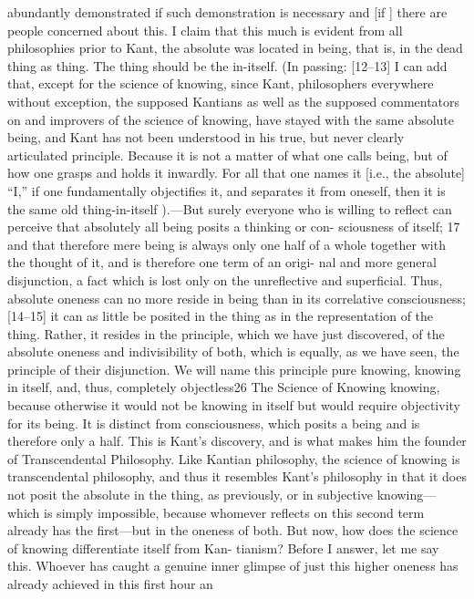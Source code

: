 abundantly demonstrated if such demonstration is necessary and [if ] there are
people concerned about this. I claim that this much is evident from all
philosophies prior to Kant, the absolute was located in being, that is, in the
dead thing as thing. The thing should be the in-itself. (In passing: [12–13] I
can add that, except for the science of knowing, since Kant, philosophers
everywhere without exception, the supposed Kantians as well as the supposed
commentators on and improvers of the science of knowing, have stayed with
the same absolute being, and Kant has not been understood in his true, but
never clearly articulated principle. Because it is not a matter of what one calls
being, but of how one grasps and holds it inwardly. For all that one names it
[i.e., the absolute] “I,” if one fundamentally objectifies it, and separates it from
oneself, then it is the same old thing-in-itself ).—But surely everyone who is
willing to reflect can perceive that absolutely all being posits a thinking or con-
sciousness of itself; 17 and that therefore mere being is always only one half of a
whole together with the thought of it, and is therefore one term of an origi-
nal and more general disjunction, a fact which is lost only on the unreflective
and superficial. Thus, absolute oneness can no more reside in being than in its
correlative consciousness; [14–15] it can as little be posited in the thing as in
the representation of the thing. Rather, it resides in the principle, which we
have just discovered, of the absolute oneness and indivisibility of both, which
is equally, as we have seen, the principle of their disjunction. We will name this
principle pure knowing, knowing in itself, and, thus, completely objectless26
The Science of Knowing
knowing, because otherwise it would not be knowing in itself but would
require objectivity for its being. It is distinct from consciousness, which posits
a being and is therefore only a half. This is Kant’s discovery, and is what makes
him the founder of Transcendental Philosophy. Like Kantian philosophy, the
science of knowing is transcendental philosophy, and thus it resembles Kant’s
philosophy in that it does not posit the absolute in the thing, as previously, or
in subjective knowing—which is simply impossible, because whomever
reflects on this second term already has the first—but in the oneness of both.
But now, how does the science of knowing differentiate itself from Kan-
tianism? Before I answer, let me say this. Whoever has caught a genuine inner
glimpse of just this higher oneness has already achieved in this first hour an
